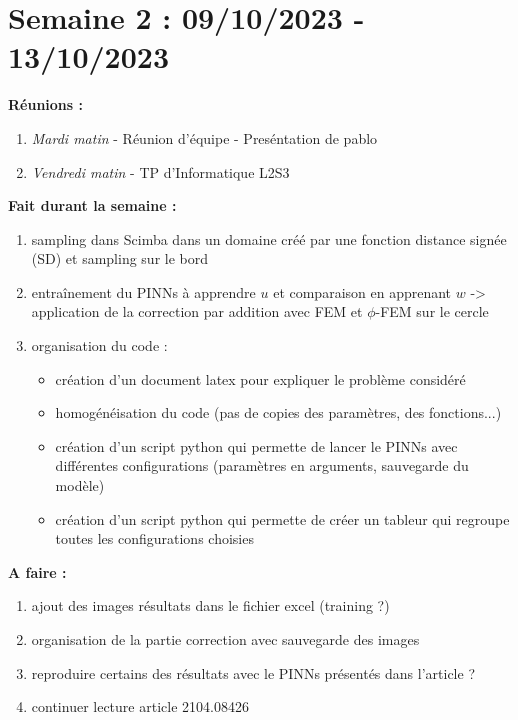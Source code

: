 \documentclass[french]{article}
\begin{document}
\section{Semaine 2 : 09/10/2023 - 13/10/2023}
	\textbf{Réunions :}
	\begin{enumerate}[label=\textbullet]
		\item \textit{Mardi matin} -  Réunion d'équipe - Preséntation de pablo
		\item \textit{Vendredi matin} - TP d'Informatique L2S3
	\end{enumerate}
	\textbf{Fait durant la semaine :}
	\begin{enumerate}[label=\textbullet]
		\item sampling dans Scimba dans un domaine créé par une fonction distance signée (SD) et sampling sur le bord
		\item entraînement du PINNs à apprendre $u$ et comparaison en apprenant $w$ -> application de la correction par addition avec FEM et $\phi$-FEM sur le cercle
		\item organisation du code :
		\begin{itemize}
			\item création d'un document latex pour expliquer le problème considéré
			\item homogénéisation du code (pas de copies des paramètres, des fonctions...)
			\item création d'un script python qui permette de lancer le PINNs avec différentes configurations (paramètres en arguments, sauvegarde du modèle)
			\item création d'un script python qui permette de créer un tableur qui regroupe toutes les configurations choisies
		\end{itemize} 
	\end{enumerate}
	
	\textbf{A faire :}
	\begin{enumerate}[label=\textbullet]
		\item ajout des images résultats dans le fichier excel (training ?)
		\item organisation de la partie correction avec sauvegarde des images
		\item reproduire certains des résultats avec le PINNs présentés dans l'article ?
		\item continuer lecture article 2104.08426
	\end{enumerate}
\end{document}
